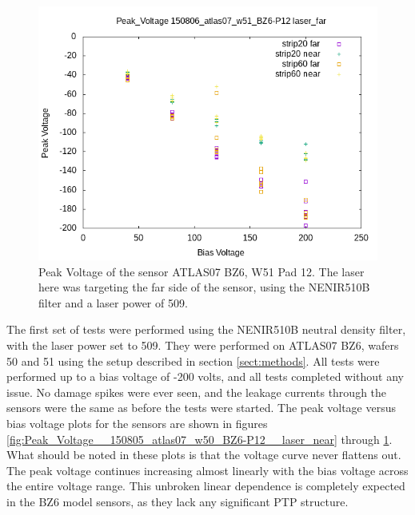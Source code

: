 \documentclass{report}
\begin{document}
            \begin{figure}[h] 
                \includegraphics[height=.4\textheight]{Peak_Voltage__150806_atlas07_w51_BZ6-P12__laser_far}
                \centering
                \caption{ Peak Voltage of the sensor ATLAS07 BZ6, W51 Pad 12. The laser here was targeting the far side of the sensor, using the NENIR510B filter and a laser power of 509. }
                \label{fig:Peak_Voltage__150806_atlas07_w51_BZ6-P12__laser_far}
            \end{figure}

            The first set of tests were performed using the NENIR510B neutral density filter, with the laser power set to 509. They were performed on ATLAS07 BZ6, wafers 50 and 51 using the setup described in section \ref{sect:methods}. All tests were performed up to a bias voltage of -200 volts, and all tests completed without any issue. No damage spikes were ever seen, and the leakage currents through the sensors were the same as before the tests were started. The peak voltage versus bias voltage plots for the sensors are shown in figures \ref{fig:Peak_Voltage__150805_atlas07_w50_BZ6-P12__laser_near} through \ref{fig:Peak_Voltage__150806_atlas07_w51_BZ6-P12__laser_far}. What should be noted in these plots is that the voltage curve never flattens out. The peak voltage continues increasing almost linearly with the bias voltage across the entire voltage range. This unbroken linear dependence is completely expected in the BZ6 model sensors, as they lack any significant PTP structure.
\end{document}
